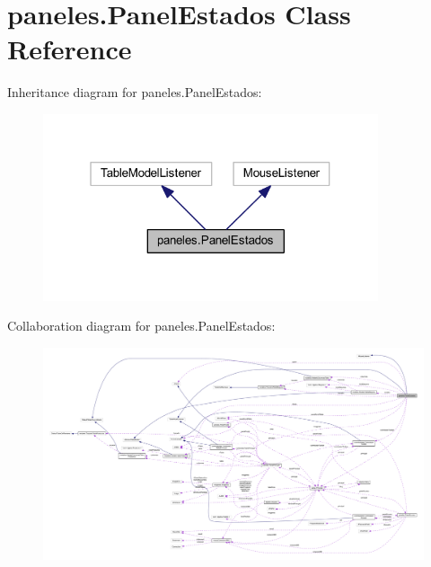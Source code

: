 \hypertarget{classpaneles_1_1_panel_estados}{}\section{paneles.\+Panel\+Estados Class Reference}
\label{classpaneles_1_1_panel_estados}


Inheritance diagram for paneles.\+Panel\+Estados\+:
\nopagebreak
\begin{figure}[H]
\begin{center}
\leavevmode
\includegraphics[width=280pt]{classpaneles_1_1_panel_estados__inherit__graph}
\end{center}
\end{figure}


Collaboration diagram for paneles.\+Panel\+Estados\+:
\nopagebreak
\begin{figure}[H]
\begin{center}
\leavevmode
\includegraphics[width=350pt]{classpaneles_1_1_panel_estados__coll__graph}
\end{center}
\end{figure}
